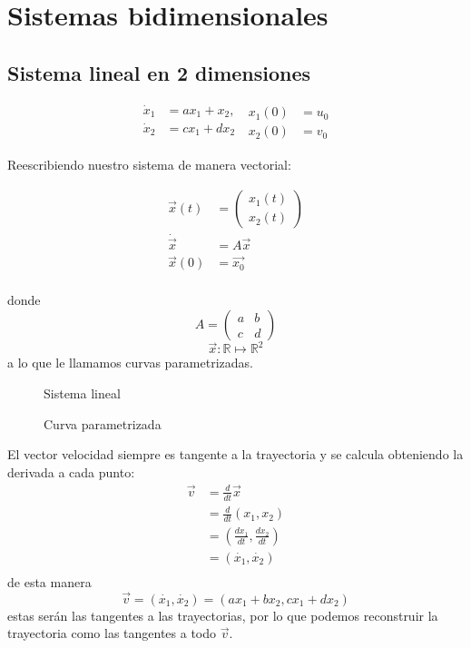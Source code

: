 \chapter{Sistemas bidimensionales}
\section{Sistema lineal en 2 dimensiones}
$$
\begin{aligned}
  \dot{x}_1&=ax_1+x_2,  \\
  \dot{x}_2 &= cx_1 + dx_2 \\
\end{aligned} \ 
\begin{aligned}
    x_1(0)&=u_0 \\
  x_2(0)&=v_0  
\end{aligned}
$$

Reescribiendo nuestro sistema de manera vectorial:

$$
\begin{aligned}
  \vec{x}(t)&=
\begin{pmatrix} 
x_1(t) \\
x_2(t)
\end{pmatrix} \\
 \dot{\vec{x}} &= A \vec{x} 
 \\  \vec{x}(0) &= \vec{x_0}  \\ 
\end{aligned}
$$

donde $$
A = \begin{pmatrix} a & b \\ c & d \end{pmatrix} 
$$
$$
\vec{x}: \mathbb{R} \mapsto \mathbb{R}^2
$$
a lo que le llamamos curvas parametrizadas.
\begin{figure}[ht]
    \centering
    \caption{Sistema lineal}
    \label{fig:sistemalineal}
\end{figure}

\begin{figure}[ht]
    \centering
    \caption{Curva parametrizada}
    \label{fig:curvas-parametrizadas}
\end{figure}
\begin{tcolorbox}[colback=Black!4,colframe=White] 
\begin{nota}
  El vector velocidad siempre es tangente a la trayectoria y se calcula obteniendo la derivada a cada punto:
  $$
  \begin{aligned}
    \vec{v} &= \frac{d}{dt} \vec{x} \\
    &= \frac{d}{dt}(x_1,x_2) \\
    &= \left( \frac{dx_1}{dt}, \frac{dx_2}{dt} \right)  \\ 
    &= (\dot{x_1}, \dot{x_2}) \\ 
  \end{aligned}
  $$
  de esta manera
  $$
  \vec{v}=(\dot{x_1}, \dot{x_2}) = (ax_1+bx_2, cx_1+dx_2)
  $$
   estas serán las tangentes a las trayectorias, por lo que podemos reconstruir la trayectoria como las tangentes a todo $\vec{v}$.

\end{nota}
\end{tcolorbox}

